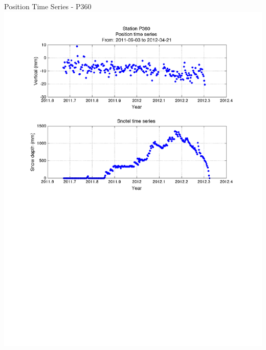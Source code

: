 \documentclass{beamer}
\begin{document}
\begin{frame}{Position Time Series - P360}
  \includegraphics[width=1\linewidth,trim=50 0 50 20, clip=true]{logan/p360_snotel.pdf}
\end{frame}
\end{document}
